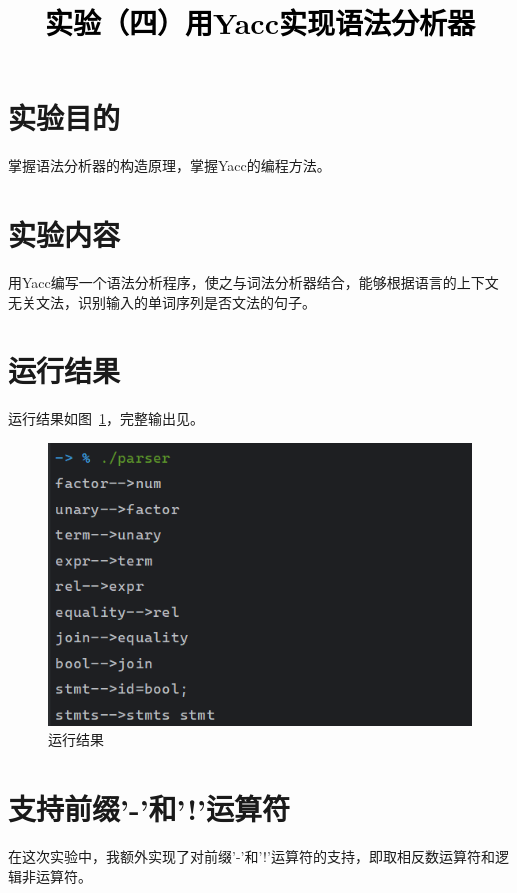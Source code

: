 \documentclass[a4paper,twoside]{article}
\newcommand{\PaperTitle}{实验（四）用Yacc实现语法分析器}  %
\begin{document}
\newpage

\title{
	\Large{\textcolor{black}{\PaperTitle}}
}
	
	
\maketitle
	
\tableofcontents
 
\newpage
\setcounter{page}{1}

\begin{spacing}{1.2}

\section{实验目的}

掌握语法分析器的构造原理，掌握Yacc的编程方法。

\section{实验内容}

用Yacc编写一个语法分析程序，使之与词法分析器结合，能够根据语言的上下文无关文法，识别输入的单词序列是否文法的句子。

\section{运行结果}

运行结果如图~\ref{fig:output}，完整输出见。
\begin{figure}[htb]
	\centering
	\includegraphics[width=0.6\linewidth]{output.png}
	\caption{运行结果}
	\label{fig:output}
\end{figure}

\section{支持前缀'-'和'!'运算符}

在这次实验中，我额外实现了对前缀'-'和'!'运算符的支持，即取相反数运算符和逻辑非运算符。


\end{spacing}
\end{document}
